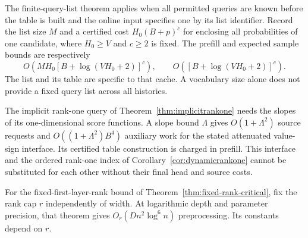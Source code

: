 The finite-query-list theorem applies when all permitted queries
are known before the table is built and the online input specifies
one by its list identifier. Record the list size $M$ and a certified
cost $H_0(B+p)^c$ for enclosing all probabilities of one candidate,
where $H_0\ge V$ and $c\ge2$ is fixed.
The prefill and expected sample bounds are respectively
\[
 O(MH_0[B+\log(VH_0+2)]^c),\qquad
 O([B+\log(VH_0+2)]^c).
\]
The list and its table are specific to that cache. A vocabulary
size alone does not provide a fixed query list across all histories.

The implicit rank-one query of Theorem~\ref{thm:implicitrankone}
needs the slopes of its one-dimensional score functions. A slope bound $\Lambda$ gives
$O(1+\Lambda^2)$ source requests and
$O((1+\Lambda^2)B^4)$ auxiliary work for the stated attenuated
value-sign interface. Its certified table construction is charged
in prefill. This interface and the ordered rank-one index of
Corollary~\ref{cor:dynamicrankone} cannot be substituted for each
other without their final head and source costs.

For the fixed-first-layer-rank bound of
Theorem~\ref{thm:fixed-rank-critical}, fix the rank cap $r$
independently of width. At logarithmic depth and parameter precision,
that theorem gives $O_r(Dn^2\log^6n)$ preprocessing. Its constants
depend on $r$.
